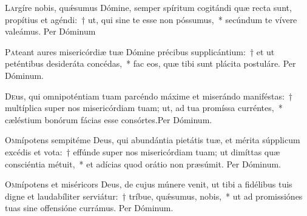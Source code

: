 \documentclass[vesperale_romanum.tex]{subfiles}
\begin{document}


\oratio

\lettrine{L}{a}rgíre nobis, quǽsumus Dómine, semper spíritum cogitándi quæ recta sunt, propítius et agéndi:~† ut, qui sine te esse non póssumus,~* secúndum te vívere valeámus. Per Dóminum 



\oratio

\lettrine{P}{a}teant aures misericórdiæ tuæ Dómine précibus supplicántium:~† et ut peténtibus desideráta concédas,~* fac eos, quæ tibi sunt plácita postuláre.
Per Dóminum.



\oratio

\lettrine{D}{e}us, qui omnipoténtiam tuam parcéndo máxime et miserándo maniféstas:~† multíplica super nos misericórdiam tuam; ut, ad tua promíssa curréntes,~* cæléstium bonórum fácias esse consórtes.Per Dóminum.



\oratio

\lettrine{O}{m}nípotens sempitéme Deus, qui abundántia pietátis tuæ, et mérita súpplicum excédis et vota:~† effúnde super nos misericórdiam tuam; ut dimíttas quæ consciéntia métuit,~* et adícias quod orátio non præsúmit. Per Dóminum.



\oratio

\lettrine{O}{m}nípotens et miséricors Deus, de cujus múnere venit, ut tibi a fidélibus tuis digne et laudabíliter serviátur:~† tríbue, quǽsumus, nobis,~* ut ad promissiónes tuas sine offensióne currámus. Per Dóminum.


\end{document}
